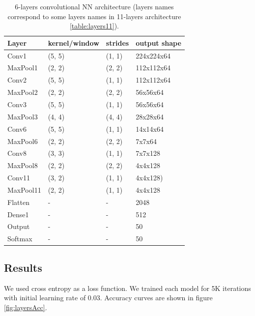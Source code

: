\documentclass[a4paper]{article}
\begin{document}
\begin{table}[!h]
    \caption{6-layers convolutional NN architecture (layers names correspond to some layers names in 11-layers architecture \ref{table:layers11}).
    \label{table:layers6}
    }
\begin{center}
    \begin{tabular}{| l | l | l | l |}
    \hline
        Layer & kernel/window& strides & output shape\\
    \hline
        Conv1  & (5, 5)&        (1, 1)&     224x224x64  \\
    \hline
        MaxPool1 & (2, 2)&      (2, 2)&     112x112x64  \\
        Conv2  & (5, 5)&        (1, 1)&     112x112x64  \\
    \hline
        MaxPool2 & (2, 2)&      (2, 2)&     56x56x64    \\
        Conv3  & (5, 5)&        (1, 1)&     56x56x64    \\
    \hline
        MaxPool3 & (4, 4)&      (4, 4)&     28x28x64    \\
        Conv6  & (5, 5)&        (1, 1)&     14x14x64  \\
    \hline
        MaxPool6 & (2, 2)&      (2, 2)&     7x7x64  \\
        Conv8  & (3, 3)&        (1, 1)&     7x7x128\\
    \hline
        MaxPool8 & (2, 2)&      (2, 2)&     4x4x128  \\
        Conv11 & (3, 2)&        (1, 1)&     4x4x128)\\  %
    \hline
        MaxPool11 & (2, 2)&      (1, 1)&     4x4x128  \\
        Flatten & - & - & 2048 \\
        Dense1 & - & - & 512 \\
    \hline
        Output & - & - & 50 \\
        Softmax & - & - & 50 \\
    \hline
    \end{tabular}
\end{center}
\end{table}

\subsection{Results}
We used cross entropy as a loss function.
We trained each model for 5K iterations with initial learning rate of 0.03.
Accuracy curves are shown in figure \ref{fig:layersAcc}.
\end{document}
